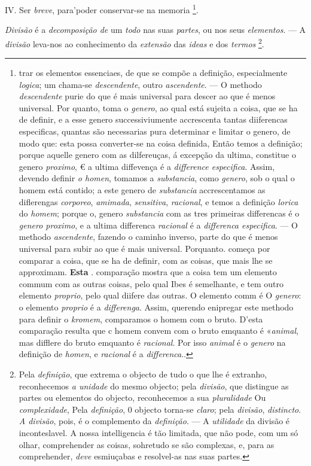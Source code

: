 IV. Ser \emph{breve}, para'poder conservar-se na memoria \footnote{trar os elementos essenciaes, de que se compõe a definição, especialmente \emph{logica}; um chama-se \emph{descendente}, outro \emph{ascendente}. --- O methodo \emph{descendente} purie do que é mais universal para descer ao que é menos universal. Por quanto, toma o \emph{genero}, ao qual está sujeita a coisa, que se ha de definir, e a esse genero successiviumente accrescenta tantas diiferencas especificas, quantas são necessarias pura determinar e limitar o genero, de modo que: esta possa converter-se na coisa definida, Então temos a definição; porque aquelle genero com as dilfereuças, á excepção da ultima, constitue o genero \emph{proximo}, € a ultima diffevença é a \emph{difference especifica}. Assim, devendo definir \emph{o homen}, tomamos a \emph{substancia}, como \emph{genero}, sob o qual o homem está contido; a este genero de \emph{substancia} accrescentamos as diflerengas \emph{corporeo}, \emph{amimada}, \emph{sensitiva}, \emph{racional}, e temos a definição \emph{lorica} do \emph{homem}; porque o, genero \emph{substancia} com as tres primeiras differencas é o \emph{genero proximo}, e a ultima differenca \emph{racional} é a \emph{differenca especifica}. --- O methodo \emph{ascendente}, fazendo o caminho inverso, parte do que é menos universal para subir ao que é mais universal. Porquanto. começa por comparar a coisa, que se ha de definir, com as coisas, que mais lhe se approximam. \textbf{Esta} . comparação mostra que a coisa tem um elemento commum com as outras coisas, pelo qual Ibes é semelhante, e tem outro elemento \emph{proprio}, pelo qual diifere das outras. O elemento comm é O \emph{genero}: o elemento \emph{proprio} é a \emph{differenga}. Assim, querendo enipregar este methodo para definir o \emph{kromem}, comparamos o homem com o bruto. D'esta comparação resulta que c homem convem com o bruto emquanto é «\emph{animal}, mas difflere do bruto emquanto é \emph{racional}. Por isso \emph{animal} é o \emph{genero} na definição de \emph{homen}, e \emph{racional} é a \emph{differenca}..}.


  
\emph{Divisão} é a \emph{decomposição de} um \emph{todo} nas suas \emph{partes}, ou nos seus \emph{elementos}. --- A \emph{divisão} leva-nos ao conhecimento da \emph{extensão} das \emph{ideas} e dos \emph{termos} \footnote{Pela \emph{definição}, que extrema o objecto de tudo o que lhe é extranho, reconhecemos \emph{a unidade} do mesmo objecto; pela \emph{divisão}, que distingue as partes ou elementos do objecto, reconhecemos a sua \emph{pluralidade} Ou \emph{complexidade}, Pela \emph{definição}, 0 objecto torna-se \emph{claro}; pela \emph{divisão}, \emph{distincto}. \emph{A divisão}, pois, é o complemento da \emph{definição}. --- A \emph{utilidade} da divisão é inconteslavel. A nossa intelligencia é tão limitada, que não pode, com um só olhar, comprehender as coisas, sohretudo se são complexas, e, para as comprehender, \emph{deve} esmiuçabas e resolvel-as nas suas partes.}.

